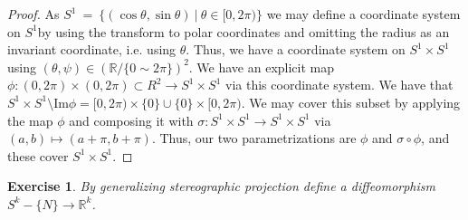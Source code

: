 \documentclass{article}
\newtheorem{exercise}{Exercise}
\begin{document}
  \begin{proof}
    As $S^{1} \ = \ \{(\cos\theta,\sin\theta) \ | \ \theta \in [0,2\pi)\}$ we may define a coordinate system on $S^{1}$by using the transform to polar coordinates and omitting the radius as an invariant coordinate, i.e. using $\theta$. Thus, we have a coordinate system on $S^{1}\times S^{1}$ using $(\theta,\psi) \in (\mathbb{R}/\{0 \sim  2\pi\})^{2}$. We have an explicit map $\phi: (0,2\pi) \times (0,2\pi) \subset R^{2} \to S^{1}\times S^{1}$ via this coordinate system. We have that $S^{1}\times S^{1} \setminus \text{Im}\phi = [0,2\pi) \times \{0\} \cup \{0\} \times [0,2\pi)$. We may cover this subset by applying the map $\phi$ and composing it with $\sigma: S^{1}\times S^{1} \to S^{1} \times S^{1}$ via $(a,b) \mapsto (a+\pi, b+\pi)$. Thus, our two parametrizations are $\phi$ and $\sigma \circ\phi$, and these cover $S^{1}\times S^{1}$.   
    \end{proof}
\begin{exercise}
  By generalizing stereographic projection define a diffeomorphism $S^{k} - \{N\} \to \mathbb{R}^{k}$.
\end{exercise}
\end{document}
